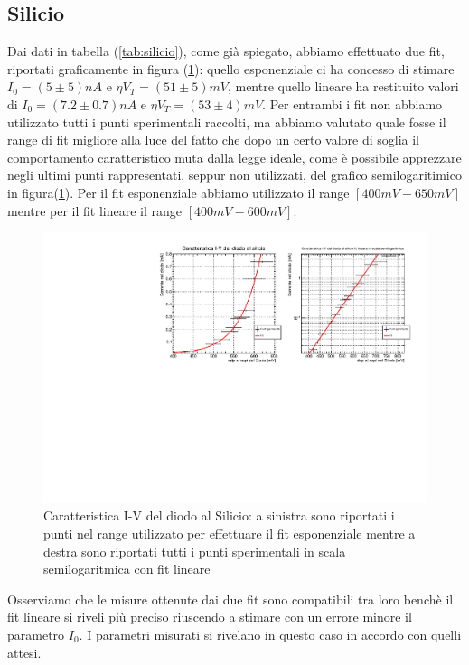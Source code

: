 \documentclass[]{article}
\begin{document}
\subsection{Silicio}
Dai dati in tabella (\ref{tab:silicio}), come già spiegato, abbiamo effettuato due fit, riportati graficamente in figura (\ref{fig:silicio}): quello esponenziale ci ha concesso di stimare $I_0=(5\pm5)nA$ e $\eta V_T=(51\pm5)mV$, mentre quello lineare ha restituito valori di $I_0=(7.2\pm0.7)nA$ e $\eta V_T=(53\pm4)mV$. Per entrambi i fit non abbiamo utilizzato tutti i punti sperimentali raccolti, ma abbiamo valutato quale fosse il range di fit migliore alla luce del fatto che dopo un certo valore di soglia il comportamento caratteristico muta dalla legge ideale, come è possibile apprezzare negli ultimi punti rappresentati, seppur non utilizzati, del grafico semilogaritimico in figura(\ref{fig:silicio}). 
Per il fit esponenziale abbiamo utilizzato il range $[400mV-650mV]$ mentre per il fit lineare il range $[400mV-600mV]$.
\begin{figure}[H]
	\centering
	\includegraphics[width=0.8\linewidth]{../Silicio/canvas}
	\caption{Caratteristica I-V del diodo al Silicio: a sinistra sono riportati i punti nel range utilizzato per effettuare il fit esponenziale mentre a destra sono riportati tutti i punti sperimentali in scala semilogaritmica con fit lineare}
	\label{fig:silicio}
\end{figure}
Osserviamo che le misure ottenute dai due fit sono compatibili tra loro benchè il fit lineare si riveli più preciso riuscendo a stimare con un errore minore il parametro $I_0$.
I parametri misurati si rivelano in questo caso in accordo con quelli attesi.
\end{document}
